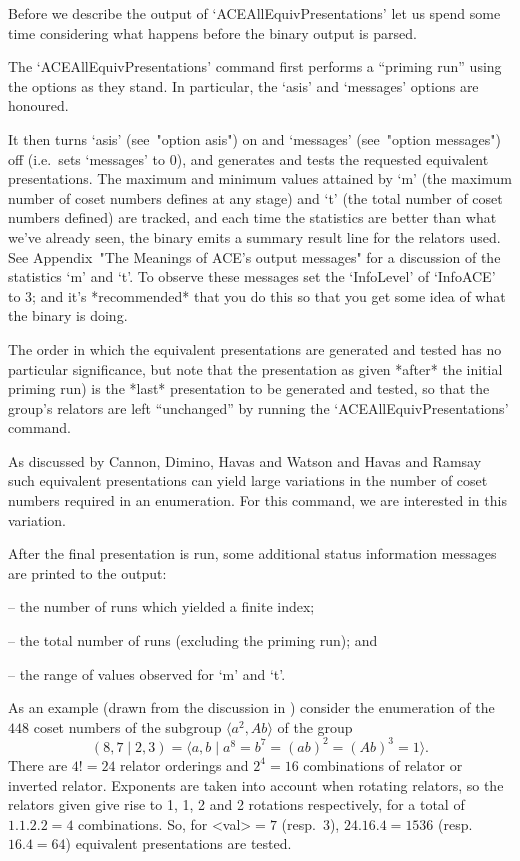 Before we describe the {\GAP} output of `ACEAllEquivPresentations' let
us spend some time considering what happens before the  {\ACE}  binary
output is parsed.

The `ACEAllEquivPresentations'  command  first  performs  a  ``priming
run'' using the options as they stand. In particular, the  `asis'  and
`messages' options are honoured.

It  then  turns  `asis'  (see~"option   asis")   on   and   `messages'
(see~"option messages") off (i.e.~sets `messages' to 0), and generates
and tests the requested  equivalent  presentations.  The  maximum  and
minimum values attained by `m' (the maximum number  of  coset  numbers
defines at any stage) and `t'  (the  total  number  of  coset  numbers
defined) are tracked, and each time the  statistics  are  better  than
what we've already seen, the {\ACE} binary emits a summary result line
for the relators used. See  Appendix~"The  Meanings  of  ACE's  output
messages" for a discussion of the statistics `m' and `t'.  To  observe
these messages set  the  `InfoLevel'  of  `InfoACE'  to  3;  and  it's
*recommended* that you do this so that you get some idea of  what  the
{\ACE} binary is doing.

The order in which the  equivalent  presentations  are  generated  and
tested has no particular significance, but note that the  presentation
as given *after* the initial priming run) is the  *last*  presentation
to be generated and tested, so that  the  group's  relators  are  left
``unchanged'' by running the `ACEAllEquivPresentations' command.

As discussed by Cannon, Dimino, Havas  and  Watson  \cite{CDHW73}  and
Havas and Ramsay \cite{HR99b} such equivalent presentations can  yield
large variations in  the  number  of  coset  numbers  required  in  an
enumeration. For this command, we are interested in this variation.

After  the  final  presentation  is  run,   some   additional   status
information messages are printed to the {\ACE} output:

\beginlist
\item{--}  the number of runs which yielded a finite index; 
\item{--}  the total number of runs (excluding the priming run); and 
\item{--}  the range of values observed for `m' and `t'.
\endlist

As an example (drawn from the discussion in \cite{HR99a}) consider the
enumeration   of   the   $448$   coset   numbers   of   the   subgroup
$\langle  a^2,Ab \rangle$ of the group
$$
(8,7 \mid 2,3) 
    = \langle a,b \mid a^8 = b^7 = (ab)^2 = (Ab)^3 = 1 \rangle.
$$
There are $4!=24$  relator  orderings  and  $2^4=16$  combinations  of
relator or inverted relator. Exponents are  taken  into  account  when
rotating relators, so the relators given give rise to 1, 1,  2  and  2
rotations respectively, for a total of $1.1.2.2=4$  combinations.  So,
for  <val>${} = 7$   (resp.~$3$),   $24.16.4=1536$   (resp.~$16.4=64$)
equivalent presentations are tested.

